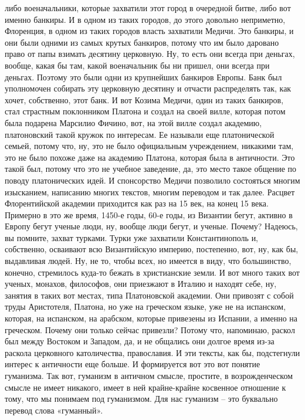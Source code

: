 либо военачальники, которые захватили этот город в очередной битве, либо вот
именно банкиры. И в одном из таких городов, до этого довольно неприметно,
Флоренция, в одном из таких городов власть захватили Медичи. Это банкиры, и они
были одними из самых крутых банкиров, потому что им было даровано право от папы
взимать десятину церковную. Ну, то есть они всегда при деньгах, вообще, какая бы
там, какой военачальник бы ни пришел, они всегда при деньгах. Поэтому это были
одни из крупнейших банкиров Европы. Банк был уполномочен собирать эту церковную
десятину и отчасти распределять так, как хочет, собственно, этот банк. И вот
Козима Медичи, один из таких банкиров, стал страстным поклонником Платона и
создал на своей вилле, которая потом была подарена Марсилио Фичино, вот, на этой
вилле создал академию, платоновский такой кружок по интересам. Ее называли еще
платонической семьей, потому что, ну, это не было официальным учреждением,
никакими там, это не было похоже даже на академию Платона, которая была в
античности. Это такой был, потому что это не учебное заведение, да, это место
такое общение по поводу платонических идей. И спонсорство Медичи позволило
состояться многим изысканием, написанию многих текстов, многим переводом и так
далее. Расцвет Флорентийской академии приходится как раз на 15 век, на конец 15
века. Примерно в это же время, 1450-е годы, 60-е годы, из Византии бегут,
активно в Европу бегут ученые люди, ну, вообще люди бегут, и ученые. Почему?
Надеюсь, вы помните, захват турками. Турки уже захватили Константинополь и,
собственно, осваивают всю Византийскую империю, постепенно, вот, ну, как бы,
выдавливая людей. Ну, не то, чтобы всех, но имеется в виду, что большинство,
конечно, стремилось куда-то бежать в христианские земли. И вот много таких вот
ученых, монахов, философов, они приезжают в Италию и находят себе, ну, занятия в
таких вот местах, типа Платоновской академии. Они привозят с собой труды
Аристотеля, Платона, но уже на греческом языке, уже не на испанском, которая, на
испанском, на арабском, которые привезены из Испании, а именно на греческом.
Почему они только сейчас привезли? Потому что, напоминаю, раскол был между
Востоком и Западом, да, и не общались они долгое время из-за раскола церковного
католичества, православия. И эти тексты, как бы, подстегнули интерес к
античности еще больше. И формируется вот это вот понятие гуманизма. Так вот,
гуманизм в античном смысле, простите, в возрожденческом смысле не имеет
никакого, имеет в ней крайне-крайне косвенное отношение к тому, что мы понимаем
под гуманизмом. Для нас гуманизм – это буквально перевод слова «гуманный».
